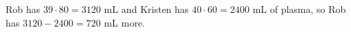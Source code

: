 Rob has $39\cdot80=3120$ mL and Kristen has $40\cdot60=2400$ mL of plasma, so Rob has $3120-2400=\boxed{720}$ mL more.
